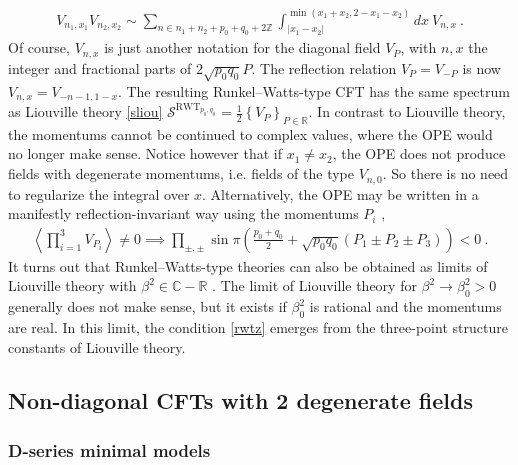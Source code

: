 \documentclass[12pt, a4paper]{article}
\theoremstyle{break}
\begin{document}
\begin{align}
 \boxed{V_{n_1,x_1}V_{n_2,x_2} \sim \sum_{n\in n_1+n_2+p_0+q_0+2\mathbb{Z}}
\int_{|x_1-x_2|}^{\min (x_1+x_2,2-x_1-x_2)} dx\ V_{n, x}}\ .
\end{align}
Of course, $V_{n,x}$ is just another notation for the diagonal field $V_P$, with $n,x$ the integer and fractional parts of $2\sqrt{p_0q_0}P$. The reflection relation $V_P=V_{-P}$ is now $V_{n,x}=V_{-n-1,1-x}$. 
The resulting Runkel--Watts-type CFT has the same spectrum as Liouville theory \eqref{sliou} $
 \mathcal{S}^{\text{RWT}_{p_0,q_0}} = \frac12 \left\{ V_P\right\}_{P\in \mathbb{R}}$. In contrast to Liouville theory, the momentums cannot be continued to complex values, where the OPE would no longer make sense. Notice however that if $x_1\neq x_2$, the OPE does not produce fields with degenerate momentums, i.e. fields of the type $V_{n,0}$. So there is no need to regularize the integral over $x$. Alternatively, the OPE may be written in a manifestly reflection-invariant way using the momentums $P_i$ \cite{rs15},
 \begin{align}
  \left<\prod_{i=1}^3 V_{P_i}\right>\neq 0 \implies \prod_{\pm,\pm} \sin\pi\left(\tfrac{p_0+q_0}{2}+\sqrt{p_0q_0}(P_1\pm P_2\pm P_3)\right) < 0 \ .
  \label{rwtz}
 \end{align}
It turns out that Runkel--Watts-type theories can also be obtained as limits of Liouville theory with $\beta^2\in \mathbb{C}-\mathbb{R}$ \cite{mce07}. The limit of Liouville theory for $\beta^2\to \beta_0^2>0$ generally does not make sense, but it exists if $\beta_0^2$ is rational and the momentums are real. In this limit, the condition \eqref{rwtz} emerges from the three-point structure constants of Liouville theory. 


\subsection{Non-diagonal CFTs with 2 degenerate fields}

\subsubsection{D-series minimal models}
\end{document}
